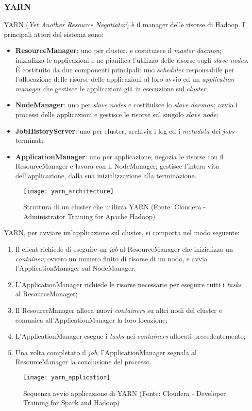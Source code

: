 \subsubsection{YARN}
YARN (\textit{Yet Another Resource Negotiator}) è il manager delle risorse di Hadoop. I principali attori del sistema sono:
\begin{itemize}
	\item \textbf{ResourceManager}: uno per \gls{cluster}, e costituisce il \textit{master \gls{daemon}}; inizializza le applicazioni e ne pianifica l'utilizzo delle risorse sugli \textit{slave nodes}. È costituito da due componenti principali: uno \textit{scheduler} responsabile per l'allocazione delle risorse delle applicazioni al loro avvio ed un \textit{application manager} che gestisce le applicazioni già in esecuzione sul \textit{cluster};
	\item \textbf{NodeManager}: uno per \textit{slave nodes} e costituisce lo \textit{slave \gls{daemon}}; avvia i processi delle applicazioni e gestisce le risorse sul singolo \textit{slave node};
	\item \textbf{JobHistoryServer}: uno per \gls{cluster}, archivia i log ed i \textit{metadata} dei \textit{jobs} terminati;
	\item \textbf{ApplicationManager}: uno per applicazione, negozia le risorse con il ResourceManager e lavora con il NodeManager; gestisce l'intera vita dell'applicazione, dalla sua inizializzazione alla terminazione. 
\end{itemize}
\begin{figure}[!h]
	\centering
	\texttt{[image: yarn\_architecture]}
	\caption{Struttura di un cluster che utilizza YARN (Fonte: Cloudera - Administrator Training for Apache Hadoop)}
\end{figure}
YARN, per avviare un'applicazione sul \gls{cluster}, si comporta nel modo seguente:
\begin{enumerate}
	\item Il client richiede di eseguire un \textit{job} al ResourceManager che inizializza un \textit{container}, ovvero un numero finito di risorse di un nodo, e avvia l'ApplicationManager sul NodeManager;
	\item L'ApplicationManager richiede le risorse necessarie per eseguire tutti i \textit{tasks} al ResourceManager;
	\item Il ResourceManager alloca nuovi \textit{containers} su altri nodi del \gls{cluster} e comunica all'ApplicationManager la loro locazione;
	\item L'ApplicationManager esegue i \textit{tasks} nei \textit{containers} allocati precedentemente;
	\item Una volta completato il \textit{job}, l'ApplicationManager segnala al ResourceManager la conclusione del processo.
\end{enumerate} 
\begin{figure}[!h]
	\centering
	\texttt{[image: yarn\_application]}
	\caption{Sequenza avvio applicazione di YARN (Fonte: Cloudera - Developer Training for Spark and Hadoop)}
\end{figure}
\clearpage
